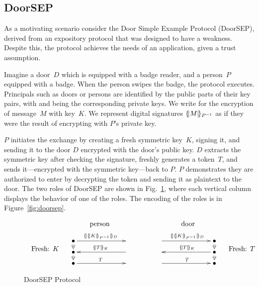 \subsection{DoorSEP}

\begin{sloppypar}
As a motivating scenario consider the Door Simple Example Protocol
(DoorSEP), derived from an expository protocol that was designed to
have a weakness.  Despite this, the protocol achieves the needs of an
application, given a trust assumption.
\end{sloppypar}

Imagine a door~$D$ which is equipped with a badge reader, and a
person~$P$ equipped with a badge.  When the person swipes the badge,
the protocol executes.  Principals such as doors or persons are
identified by the public parts of their key pairs, with  and
 being the corresponding private keys.  We write  for
the encryption of message~$M$ with key~$K$.  We represent digital
signatures $\{\!|M|\!\}_{{P}^{-1}}$ as if they were the result of encrypting
with $P$'s private key.

$P$ initiates the exchange by creating a fresh symmetric key~$K$,
signing it, and sending it to the door $D$ encrypted with the door's
public key.  $D$ extracts the symmetric key after checking the
signature, freshly generates a token~$T$, and sends it---encrypted
with the symmetric key---back to $P$.  $P$ demonstrates they are
authorized to enter by decrypting the token and sending it as
plaintext to the door.  The two roles of DoorSEP are shown in
Fig.~\ref{fig:doorsep protocol}, where each vertical column displays
the behavior of one of the roles.  The {\cpsa} encoding of the roles is
in Figure~\ref{fig:doorsep}.

\begin{figure}[tb]
  \[\begin{array}[c]{rc@{\qquad\qquad}cl}
      & \mbox{person}
      &\mbox{door}
      &\\
      \begin{array}[c]{r} ~ \\ ~ \\
        \mbox{Fresh: $K$}
      \end{array}
      & \xymatrix@R=2mm@C=7em{
      \bullet\ar@{=>}[d]\ar[r]^{\enc{\enc{K}{\iv{P}}}{D}}
      &\\
      \bullet\ar@{=>}[d]& \ar[l]_{\enc{T}{K}}\\
      \bullet \ar[r]^T & }
      &
        \xymatrix@R=2mm@C=7em{
        \ar[r]^{\enc{\enc{K}{\iv{P}}}{D}}    &\bullet\ar@{=>}[d]\\
      &\bullet\ar@{=>}[d] \ar[l]_{\enc{T}{K}}\\
      \ar[r]^T      &\bullet}
      &
        \begin{array}[c]{r} ~ \\ ~ \\
          \mbox{Fresh: $T$}
        \end{array}
  \end{array}\]
  \caption{DoorSEP Protocol}\label{fig:doorsep protocol}
\end{figure}

